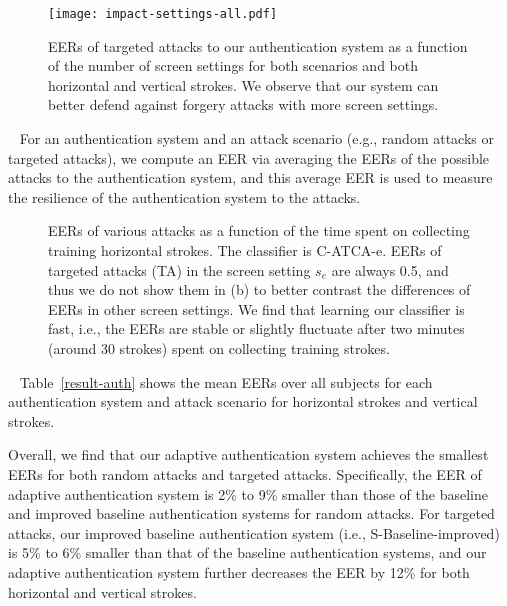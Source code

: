 \documentclass{sig-alternate-05-2015}
\newcommand{\myparatight}[1]{\smallskip\noindent{\bf {#1}:}~}
\begin{document}
\begin{figure}[ht]
\vspace{-2mm}
\centering
{\texttt{[image: impact-settings-all.pdf]}}

\caption{EERs of targeted attacks to our authentication system as a function of the number of screen settings for both scenarios and both horizontal and vertical strokes. We observe that our system can better defend against forgery attacks with more screen settings.} 
\label{impact-settings}
\vspace{-4mm}
 \end{figure}
 
 
 \myparatight{EER of authentication systems} For an authentication system and an
attack scenario (e.g., random attacks or targeted attacks), we compute an EER
via averaging the EERs of the  possible attacks to the authentication system,
 and this average EER is used to measure the resilience of
the authentication system to the attacks.   



\begin{figure*}[!t]
\centering
{}

\caption{EERs of various attacks as a function of the time spent on collecting
training horizontal strokes. The classifier is C-ATCA-e. EERs of targeted attacks (TA) in the screen setting $s_e$ are always 0.5, and thus we do not show them in (b) to better contrast the differences of EERs in other screen settings. We find that learning our classifier is fast, i.e., the EERs are stable or slightly fluctuate after two minutes (around 30 strokes) spent on collecting training strokes.} 
\label{learning}
\vspace{-2mm}
 \end{figure*}
 
 
\myparatight{Results} Table~\ref{result-auth} shows the mean EERs over all
subjects for  each authentication system and attack scenario for horizontal strokes and vertical strokes.
 
Overall, we find that our adaptive authentication system achieves the smallest
EERs for both random attacks and targeted attacks. Specifically, the EER of adaptive authentication system 
is 2\% to 9\% smaller than those of the baseline and improved baseline authentication systems for random attacks. For targeted attacks, our improved baseline authentication system (i.e., S-Baseline-improved)  is 5\% to 6\% smaller than that of the
baseline authentication systems, and our adaptive authentication system
further decreases the EER  by 12\% for both horizontal and vertical strokes.  
\end{document}
